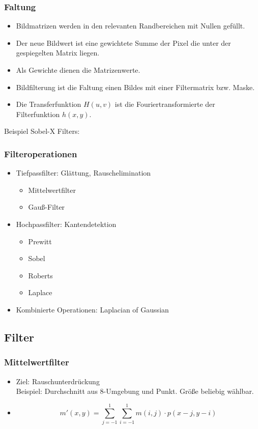 \subsubsection*{Faltung}

\begin{itemize}
\item Bildmatrizen werden in den relevanten Randbereichen mit Nullen gefüllt.
\item Der neue Bildwert ist eine gewichtete Summe der Pixel die unter der gespiegelten Matrix liegen.
\item Als Gewichte dienen die Matrizenwerte.
\item Bildfilterung ist die Faltung einen Bildes mit einer Filtermatrix bzw. Maske.
\item Die Transferfunktion $H(u,v)$ ist die Fouriertransformierte der Filterfunktion $h(x,y)$.
\end{itemize}


Beispiel Sobel-X Filters:

\subsubsection*{Filteroperationen}

\begin{itemize}
\item Tiefpassfilter: Glättung, Rauschelimination
\begin{itemize}
	\item Mittelwertfilter
	\item Gauß-Filter
\end{itemize}
\item Hochpassfilter: Kantendetektion
\begin{itemize}
	\item Prewitt
	\item Sobel
	\item Roberts
	\item Laplace
\end{itemize}
\item Kombinierte Operationen: Laplacian of Gaussian
\end{itemize}

\subsection{Filter}

\subsubsection{Mittelwertfilter}
\begin{itemize}
	\item Ziel: Rauschunterdrückung \\ Beispiel: Durchschnitt aus 8-Umgebung und Punkt. Größe beliebig wählbar.
  \item $$m'(x,y) = \sum\limits_{j=-1}^1 \sum\limits_{i=-1}^1 m(i,j) \cdot p(x-j,y-i)$$
\end{itemize}

